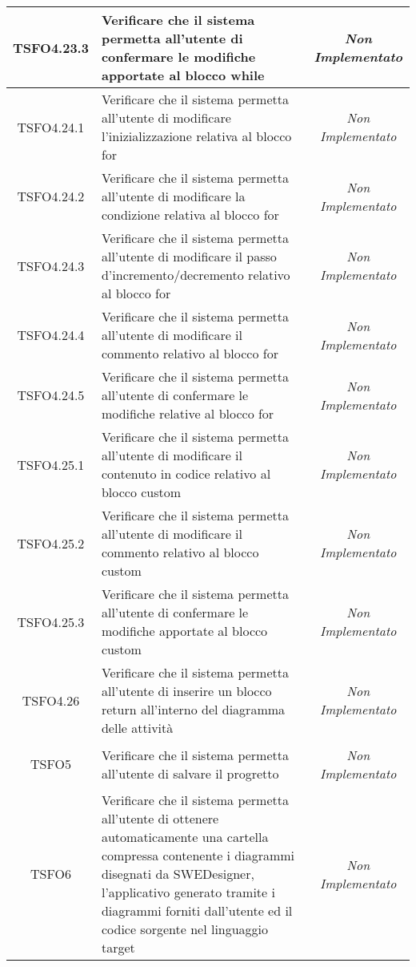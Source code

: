 \begin{longtable}{|c|>{}m{8cm}|c|}
\hypertarget{TSFO4.23.3}{TSFO4.23.3} & Verificare che il sistema permetta all'utente di confermare le modifiche apportate al blocco while & \textit{Non Implementato}\\ \hline
\hypertarget{TSFO4.24.1}{TSFO4.24.1} & Verificare che il sistema permetta all'utente di modificare l'inizializzazione relativa al blocco for & \textit{Non Implementato}\\ \hline
\hypertarget{TSFO4.24.2}{TSFO4.24.2} & Verificare che il sistema permetta all'utente di modificare la condizione relativa al blocco for & \textit{Non Implementato}\\ \hline
\hypertarget{TSFO4.24.3}{TSFO4.24.3} & Verificare che il sistema permetta all'utente di modificare il passo d'incremento/decremento relativo al blocco for & \textit{Non Implementato}\\ \hline
\hypertarget{TSFO4.24.4}{TSFO4.24.4} & Verificare che il sistema permetta all'utente di modificare il commento relativo al blocco for & \textit{Non Implementato}\\ \hline
\hypertarget{TSFO4.24.5}{TSFO4.24.5} & Verificare che il sistema permetta all'utente di confermare le modifiche relative al blocco for & \textit{Non Implementato}\\ \hline
\hypertarget{TSFO4.25.1}{TSFO4.25.1} & Verificare che il sistema permetta all'utente di modificare il contenuto in codice relativo al blocco custom & \textit{Non Implementato}\\ \hline
\hypertarget{TSFO4.25.2}{TSFO4.25.2} & Verificare che il sistema permetta all'utente di modificare il commento relativo al blocco custom & \textit{Non Implementato}\\ \hline
\hypertarget{TSFO4.25.3}{TSFO4.25.3} & Verificare che il sistema permetta all'utente di confermare le modifiche apportate al blocco custom & \textit{Non Implementato}\\ \hline
\hypertarget{TSFO4.26}{TSFO4.26} & Verificare che il sistema permetta all'utente di inserire un blocco return all'interno del diagramma delle attività & \textit{Non Implementato}\\ \hline
\hypertarget{TSFO5}{TSFO5} & Verificare che il sistema permetta all'utente di salvare il progretto & \textit{Non Implementato}\\ \hline
\hypertarget{TSFO6}{TSFO6} & Verificare che il sistema permetta all'utente di ottenere automaticamente una cartella compressa contenente i diagrammi disegnati da SWEDesigner, l'applicativo generato tramite i diagrammi forniti dall'utente ed il codice sorgente nel linguaggio target & \textit{Non Implementato}\\ \hline

\end{longtable}
